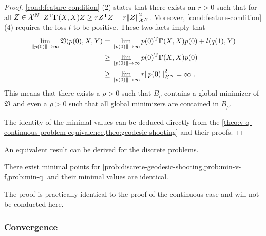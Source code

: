 \begin{proof}
	\cref{cond:feature-condition} (2) states that there exists an $r > 0$ such that for all $Z \in \mathcal{X}^N$ $Z^{\mathrm{T}} \mathbf{\Gamma}(X, X) Z \geq r Z^{\mathrm{T}} Z = r \norm{Z}_{\mathcal{X}^N}^2$.
	Moreover, \cref{cond:feature-condition} (4) requires the loss $l$ to be positive.
	These two facts imply that
	\begin{align}
		\lim_{\norm{p(0)} \rightarrow \infty} \mathfrak{V}(p(0), X, Y) 
		&= \lim_{\norm{p(0)} \rightarrow \infty} p(0)^{\mathrm{T}} \mathbf{\Gamma}(X, X) p(0) + l(q(1), Y)\\
		& \geq 	\lim_{\norm{p(0)} \rightarrow \infty} p(0)^{\mathrm{T}} \mathbf{\Gamma}(X, X) p(0) \\
		& \geq \lim_{\norm{p(0)} \rightarrow \infty} r \norm{p(0)}_{\mathcal{X}^N}^2
		= \infty \ .
	\end{align}
	This means that there exists a $\rho > 0$ such that $B_\rho$ contains a global minimizer of $\mathfrak{V}$ and even a $\rho > 0$ such that all global minimizers are contained in $B_\rho$.
	
	The identity of the minimal values can be deduced directly from the \cref{theo:v-q-continuous-problem-equivalence,theo:geodesic-shooting} and their proofs.
\end{proof}

An equivalent result can be derived for the discrete problems.
\begin{theorem}
	\label{theo:discrete-solutions-existence}
	There exist minimal points for \cref{prob:discrete-geodesic-shooting,prob:min-v-f,prob:min-q} and their minimal values are identical.
\end{theorem}
The proof is practically identical to the proof of the continuous case and will not be conducted here.

\subsubsection{Convergence}

